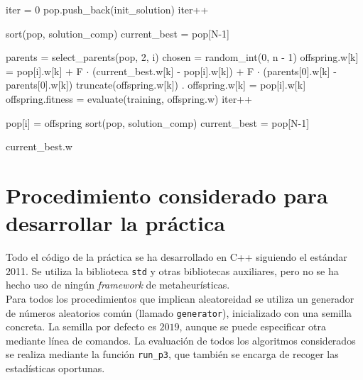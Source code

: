 \documentclass[12pt]{article}
\begin{document}
\begin{algorithm}[h!]
\begin{algorithmic}

\State iter = 0
 
    \State pop.push\_back(init\_solution)
    \State iter++
\EndFor

\State sort(pop, solution\_comp) 
\State current\_best = pop[N-1]

        \State parents = select\_parents(pop, 2, i)
        \State chosen = random\_int(0, n - 1) 
             
                \State offspring.w[k] = pop[i].w[k] $+$ F $\cdot$ (current\_best.w[k] - pop[i].w[k]) 
                 \State \hspace{7em} $ +$ F $\cdot$ (parents[0].w[k] - parents[0].w[k])
             \State truncate(offspring.w[k])  .
            \Else
                \State offspring.w[k] = pop[i].w[k]
            \EndIf
        \EndFor
        \State offspring.fitness = evaluate(training, offspring.w)
        \State iter++
        
         
            \State pop[i] = offspring
        \EndIf
    \EndFor
    \State sort(pop, solution\_comp)
    \State current\_best = pop[N-1]
\EndWhile

\State \Return current\_best.w
\EndFunction
\end{algorithmic}
\end{algorithm}

\newpage
\section{Procedimiento considerado para desarrollar la práctica}

Todo el código de la práctica se ha desarrollado en C++ siguiendo el estándar 2011. Se utiliza la biblioteca \verb|std| y otras bibliotecas auxiliares, pero no se ha hecho uso de ningún \textit{framework} de metaheurísticas.\\

Para todos los procedimientos que implican aleatoreidad se utiliza un generador de números aleatorios común (llamado \verb|generator|), inicializado con una semilla concreta. La semilla por defecto es $2019$, aunque se puede especificar otra mediante línea de comandos. La evaluación de todos los algoritmos considerados se realiza mediante la función \verb|run_p3|, que también se encarga de recoger las estadísticas oportunas.\\
\end{document}
